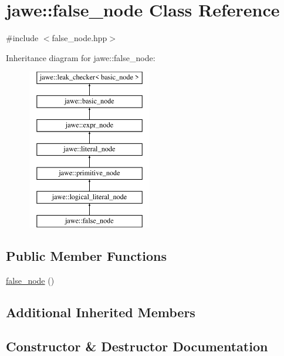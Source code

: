\hypertarget{classjawe_1_1false__node}{}\section{jawe\+:\+:false\+\_\+node Class Reference}
\label{classjawe_1_1false__node}


{\ttfamily \#include $<$false\+\_\+node.\+hpp$>$}

Inheritance diagram for jawe\+:\+:false\+\_\+node\+:\begin{figure}[H]
\begin{center}
\leavevmode
\includegraphics[height=7.000000cm]{classjawe_1_1false__node}
\end{center}
\end{figure}
\subsection*{Public Member Functions}
\begin{DoxyCompactItemize}
\item 
\hyperlink{classjawe_1_1false__node_aea4f5d3ffa7afceb4c1b0503dcfb7463}{false\+\_\+node} ()
\end{DoxyCompactItemize}
\subsection*{Additional Inherited Members}


\subsection{Constructor \& Destructor Documentation}
\mbox{\label{classjawe_1_1false__node_aea4f5d3ffa7afceb4c1b0503dcfb7463}} 

